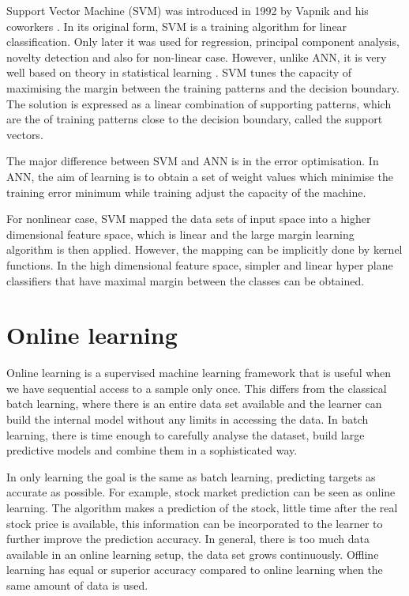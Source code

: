 Support Vector Machine (SVM) was introduced in 1992 by Vapnik and his coworkers
\cite{boser1992}. In its original form, SVM is a training algorithm for linear classification. Only later it was used for regression, principal component analysis, novelty detection and also for non-linear case.  However, unlike ANN, it is very well 
based on theory in statistical learning \cite{cortes1995}.  SVM tunes the capacity of 
maximising the margin between the training patterns and the decision boundary. The
solution is expressed as a linear combination of supporting patterns, which are the 
of training patterns close to the decision boundary, called the support vectors.

The major difference between SVM and ANN is in the error optimisation. In ANN, the aim of learning is to obtain a set of weight values which minimise the training error 
minimum while training adjust the capacity of the machine. 

For nonlinear case, SVM mapped the data sets of input space into a higher dimensional feature space, which is linear and the large margin learning algorithm is then applied. However, the mapping can be implicitly done by kernel functions. In the high dimensional feature space, simpler and linear hyper plane classifiers that have maximal margin between the classes can be obtained.

\newpage
\section{Online learning} \label{sec:onoffline}

Online learning is a supervised machine learning framework that is useful when we have sequential access to a sample only once.  This differs from the classical batch learning, where there is an entire data set available and the learner can build the internal model without any limits in accessing the data. In batch learning, there is time enough to carefully analyse the dataset, build large predictive models and combine them in a sophisticated way. 

In only learning the goal is the same as batch learning, predicting targets as accurate as possible. For example, stock market prediction can be seen as online learning. The algorithm makes a prediction of the stock, little time after the real stock price is available, this information can be incorporated to the learner to further improve the prediction accuracy. In general, there is too much data available in an online learning setup, the data set grows continuously. Offline learning has equal or superior accuracy compared to online learning when the same amount of data is used.

